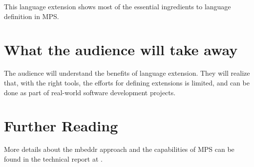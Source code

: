 \documentclass[10pt, conference, compsocconf]{IEEEtran}
\begin{document}
This language extension shows most of the essential ingredients to language
definition in MPS.

\section{What the audience will take away}
The audience will understand the benefits of language extension. They will
realize that, with the right tools, the efforts for defining extensions is
limited, and can be done as part of real-world software development projects.

\section{Further Reading}
More details about the mbeddr approach and the capabilities of MPS can be found
in the technical report at .

%
\IEEEpeerreviewmaketitle











%
%
%






\end{document}
